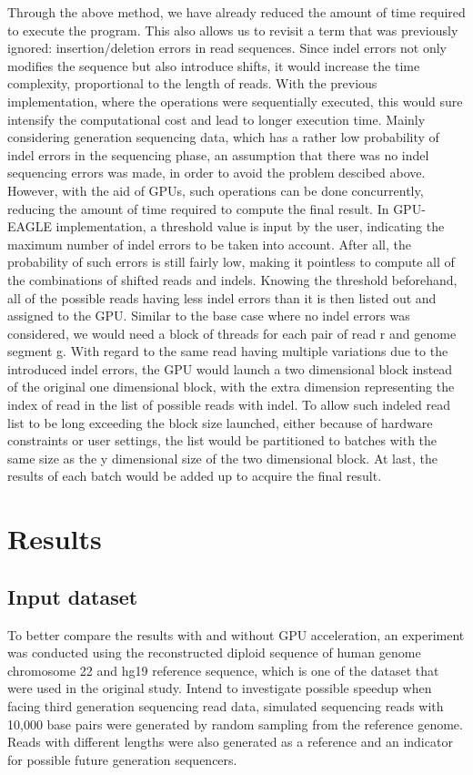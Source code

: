 \documentclass{PHlab-thesis}
\begin{document}
Through the above method, we have already reduced the amount of time required to execute the program. This also allows us to revisit a term that was previously ignored: insertion/deletion errors in read sequences. Since indel errors not only modifies the sequence but also introduce shifts, it would increase the time complexity, proportional to the length of reads. With the previous implementation, where the operations were sequentially executed, this would sure intensify the computational cost and lead to longer execution time. Mainly considering generation sequencing data, which has a rather low probability of indel errors in the sequencing phase, an assumption that there was no indel sequencing errors was made, in order to avoid the problem descibed above. However, with the aid of GPUs, such operations can be done concurrently, reducing the amount of time required to compute the final result. In GPU-EAGLE implementation, a threshold value is input by the user, indicating the maximum number of indel errors to be taken into account. After all, the probability of such errors is still fairly low, making it pointless to compute all of the combinations of shifted reads and indels. Knowing the threshold beforehand, all of the possible reads having less indel errors than it is then listed out and assigned to the GPU. Similar to the base case where no indel errors was considered, we would need a block of threads for each pair of read r and genome segment g. With regard to the same read having multiple variations due to the introduced indel errors, the GPU would launch a two dimensional block instead of the original one dimensional block, with the extra dimension representing the index of read in the list of possible reads with indel. To allow such indeled read list to be long exceeding the block size launched, either because of hardware constraints or user settings, the list would be partitioned to batches with the same size as the y dimensional size of the two dimensional block. At last, the results of each batch would be added up to acquire the final result.

\chapter{Results}
\section{Input dataset}
To better compare the results with and without GPU acceleration, an experiment was conducted using the reconstructed diploid sequence of human genome chromosome 22 and hg19 reference sequence, which is one of the dataset that were used in the original study. Intend to investigate possible speedup when facing third generation sequencing read data, simulated sequencing reads with 10,000 base pairs were generated by random sampling from the reference genome. Reads with different lengths were also generated as a reference and an indicator for possible future generation sequencers.
\end{document}

